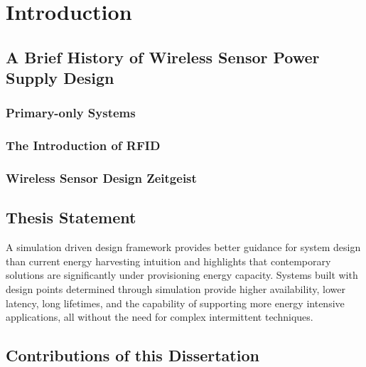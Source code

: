 \chapter{Introduction}
\label{chap:intro}



\section{A Brief History of Wireless Sensor Power Supply Design}
\subsection{Primary-only Systems}
\subsection{The Introduction of RFID}
\subsection{Wireless Sensor Design Zeitgeist}

\section{Thesis Statement}

A simulation driven design framework provides better guidance for system design than current energy harvesting intuition and highlights that contemporary solutions are significantly under provisioning energy capacity. Systems built with design points determined through simulation provide higher availability, lower latency, long lifetimes, and the capability of supporting more energy intensive applications, all without the need for complex intermittent techniques.

\the\textwidth

\section{Contributions of this Dissertation}


